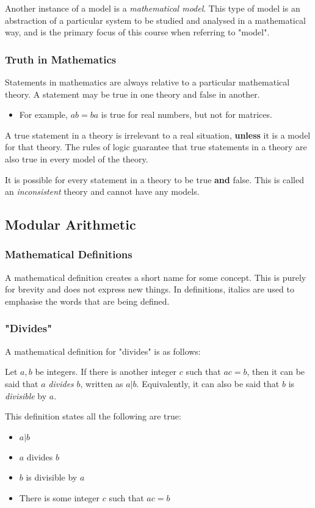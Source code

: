 \documentclass{article}
\begin{document}
Another instance of a model is a \emph{mathematical model}. 
This type of model is an abstraction of a particular system to be studied and analysed in a mathematical way,
and is the primary focus of this course when referring to "model".
%
\subsubsection{Truth in Mathematics}
Statements in mathematics are always relative to a particular mathematical theory.
A statement may be true in one theory and false in another.
\begin{itemize}
    \item For example, \(ab = ba\) is true for real numbers, but not for matrices.
\end{itemize}
A true statement in a theory is irrelevant to a real situation, \textbf{unless} it is a model for that theory.
The rules of logic guarantee that true statements in a theory are also true in every model of the theory.
\begin{notebox}
    It is possible for every statement in a theory to be true \textbf{and} false.
    This is called an \emph{inconsistent} theory and cannot have any models.
\end{notebox}

\subsection{Modular Arithmetic}
\subsubsection{Mathematical Definitions}
A mathematical definition creates a short name for some concept.
This is purely for brevity and does not express new things.
In definitions, italics are used to emphasise the words that are being defined.
%
\subsubsection{"Divides"}
A mathematical definition for "divides" is as follows:
\begin{tcolorbox}
    Let \(a, b\) be integers.
    If there is another integer \(c\) such that \(ac = b\),
    then it can be said that \(a\) \emph{divides} \(b\),
    written as \(a \vert b\).
    Equivalently, it can also be said that  \(b\) is \emph{divisible} by \(a\).
\end{tcolorbox}
This definition states all the following are true:
\begin{itemize}
    \item \(a \vert b\)
    \item \(a\) divides \(b\)
    \item \(b\) is divisible by \(a\)
    \item There is some integer \(c\) such that \(ac = b\)
\end{itemize}
%
\newpage
\end{document}
